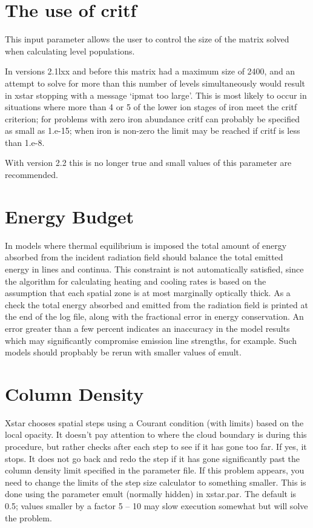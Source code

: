 \section{The use of critf}

This input parameter allows the user to control the size of the matrix solved when calculating 
level populations.  

In versions 2.1lxx and before this matrix had 
a maximum size of 2400, and an attempt to solve for more than this number of levels 
simultaneously would result in xstar stopping with a message `ipmat too large'.
This is most likely to occur in situations where more than 4 or 5 of the lower ion stages of 
iron meet the critf criterion; for problems with zero iron abundance critf can 
probably be specified as small as 1.e-15; when iron is non-zero the limit may be reached
if critf is less than 1.e-8.

With version 2.2 this is no longer true and small values of this parameter are recommended.

\section{Energy Budget}

In models where thermal equilibrium is imposed the total amount of energy 
absorbed from the incident radiation field should balance the total 
emitted energy in lines and continua.  This constraint is not 
automatically satisfied, since the algorithm for calculating heating and 
cooling rates is based on the assumption that each spatial zone is 
at most marginally optically thick.  As a check the total energy 
absorbed and emitted from the radiation field is printed at the end 
of the log file, along with the fractional error in energy conservation.
An error greater than a few percent indicates an inaccuracy 
in the model results which may significantly compromise emission line 
strengths, for example.  Such models should propbably be rerun with smaller 
values of emult.

\section{Column Density}

Xstar chooses spatial steps using a Courant condition (with 
limits) based on the local opacity.  It doesn't pay attention to 
where the cloud boundary is during this procedure, but rather checks 
after each step to see if it has gone too far.  If yes, it stops.
It does not go back and redo the step if it has gone 
significantly past the column density limit specified in the 
parameter file.  If this problem appears, you need to change 
the limits of the step size calculator to something smaller.
This is done using the parameter emult (normally hidden) in xstar.par.
The default is 0.5; values smaller by a factor 5 -- 10 
may slow execution somewhat but will solve the problem.

